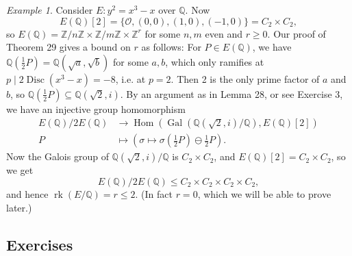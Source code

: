 \documentclass[a4paper]{article}
\theoremstyle{plain}
\theoremstyle{remark}
\newtheorem*{example}{Example}
\theoremstyle{definition}
\DeclareMathOperator{\Hom}{Hom}
\DeclareMathOperator{\Disc}{Disc}
\DeclareMathOperator{\Gal}{Gal}
\DeclareMathOperator{\rk}{rk}
\renewcommand{\O}{\mathcal{O}}
\newcommand{\Z}{\mathbb{Z}}
\newcommand{\Q}{\mathbb{Q}}
\begin{document}
\begin{example}
    Consider $E:y^2=x^3-x$ over $\Q$. Now
    \begin{equation*}
        E(\Q)[2]=\{\O,(0,0),(1,0),(-1,0)\}=C_2\times C_2,
    \end{equation*}
    so $E(\Q)=\Z/n\Z\times\Z/m\Z\times\Z^r$ for some $n,m$ even and $r\ge0$.
    Our proof of Theorem 29 gives a bound on $r$ as follows: For $P\in E(\Q)$,
    we have $\Q(\frac{1}{2}P)=\Q(\sqrt a,\sqrt b)$ for some $a,b$, which only
    ramifies at $p\mid 2\Disc(x^3-x)=-8$, i.e. at $p=2$. Then 2 is the only
    prime factor of $a$ and $b$, so $\Q(\frac{1}{2}P)\subseteq\Q(\sqrt2,i)$. By
    an argument as in Lemma 28, or see Exercise 3, we have an injective group
    homomorphism
    \begin{align*}
        E(\Q)/2E(\Q) &\to \Hom(\Gal(\Q(\sqrt2,i)/\Q),E(\Q)[2]) \\
        P &\mapsto (\sigma\mapsto
            \sigma({\textstyle\frac{1}{2}P})\ominus{\textstyle\frac{1}{2}P}).
    \end{align*}
    Now the Galois group of $\Q(\sqrt2,i)/\Q$ is $C_2\times C_2$, and
    $E(\Q)[2]=C_2\times C_2$, so we get
    \begin{equation*}
        E(\Q)/2E(\Q) \le C_2\times C_2\times C_2\times C_2,
    \end{equation*}
    and hence $\rk(E/\Q)=r\le2$. (In fact $r=0$, which we will be able to prove
    later.)
\end{example}

\subsection*{Exercises}
\end{document}
